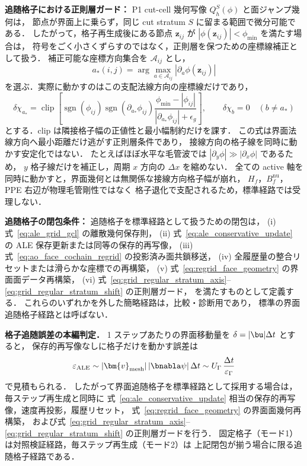 \begin{tcolorbox}[mybox, title={固定格子経路と追随格子経路}]
\textbf{追随格子における正則層ガード：}
P1 cut-cell 幾何写像 $Q_h^S(\phi)$ と面ジャンプ幾何は，
節点が界面上に乗らず，同じ cut stratum $S$ に留まる範囲で微分可能である．
したがって，格子再生成後にある節点 $\bm z_{ij}$ が
$|\phi(\bm z_{ij})|<\phi_{\min}$ を満たす場合は，
符号をごく小さくずらすのではなく，正則層を保つための座標線補正として扱う．
補正可能な座標方向集合を $\mathcal{A}_{ij}$ とし，
\begin{equation}
  a_\ast(i,j)=
  \arg\max_{a\in\mathcal{A}_{ij}}
  |\partial_a\phi(\bm z_{ij})|
  \label{eq:grid_regular_stratum_axis}
\end{equation}
を選ぶ．実際に動かすのはこの支配法線方向の座標線だけであり，
\begin{equation}
  \delta\chi_{a_\ast}
  =
  \operatorname{clip}\!\left[
  \operatorname{sgn}(\phi_{ij})\operatorname{sgn}(\partial_{a_\ast}\phi_{ij})
  \frac{\phi_{\min}-|\phi_{ij}|}{|\partial_{a_\ast}\phi_{ij}|+\epsilon_g}
  \right],
  \qquad
  \delta\chi_b=0\quad(b\ne a_\ast)
  \label{eq:grid_regular_stratum_shift}
\end{equation}
とする．clip は隣接格子幅の正値性と最小幅制約だけを課す．
この式は界面法線方向へ最小距離だけ逃がす正則層条件であり，
接線方向の格子線を同時に動かす安定化ではない．
たとえばほぼ水平な毛管波では $|\partial_y\phi|\gg|\partial_x\phi|$ であるため，
$y$ 格子線だけを補正し，周期 $x$ 方向の $\Delta x$ を縮めない．
全ての active 軸を同時に動かすと，界面幾何とは無関係な接線方向格子幅が崩れ，
$H_f$，$B_f^{\mathrm{nu}}$，PPE 右辺が物理毛管剛性ではなく
格子退化で支配されるため，標準経路では受理しない．

\textbf{追随格子の閉包条件：}
追随格子を標準経路として扱うための閉包は，
(i) 式~\eqref{eq:ale_grid_gcl} の離散幾何保存則，
(ii) 式~\eqref{eq:ale_conservative_update} の ALE 保存更新または同等の保存的再写像，
(iii) 式~\eqref{eq:ao_face_cochain_regrid} の投影済み面共鎖移送，
(iv) 全履歴量の整合リセットまたは滑らかな座標での再構築，
(v) 式~\eqref{eq:regrid_face_geometry} の界面面データ再構築，
(vi) 式~\eqref{eq:grid_regular_stratum_axis}--\eqref{eq:grid_regular_stratum_shift}
の正則層ガード，
を満たすものとして定義する．
これらのいずれかを外した簡略経路は，比較・診断用であり，
標準の界面追随格子経路とは呼ばない．
\end{tcolorbox}

\noindent\textbf{格子追随誤差の本編判定．}
1 ステップあたりの界面移動量を $\delta=|\bu|\Delta t$ とすると，
保存的再写像なしに格子だけを動かす誤差は
\[
  \varepsilon_{\mathrm{ALE}}
  \sim
  |\bm{v}_{\mathrm{mesh}}|\,|\bnabla\psi|\,\Delta t
  \sim
  U_\Gamma\,\frac{\Delta t}{\varepsilon_\Gamma}
  \label{eq:ale_omission_error}
\]
で見積もられる．
したがって界面追随格子を標準経路として採用する場合は，毎ステップ再生成と同時に
式~\eqref{eq:ale_conservative_update} 相当の保存的再写像，速度再投影，履歴リセット，
式~\eqref{eq:regrid_face_geometry} の界面面幾何再構築，
および式~\eqref{eq:grid_regular_stratum_axis}--\eqref{eq:grid_regular_stratum_shift}
の正則層ガードを行う．
固定格子（モード1）は対照検証経路，毎ステップ再生成（モード2）は
上記閉包が揃う場合に限る追随格子経路である．

